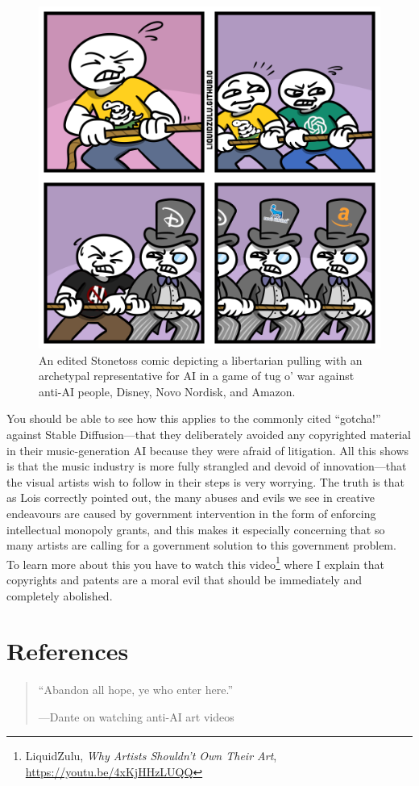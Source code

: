 \documentclass[11pt]{article}
\begin{document}
\begin{figure}[htbp]
\centering
\includegraphics[width=.9\linewidth]{./images/tug-of-war.png}
\caption{An edited Stonetoss comic depicting a libertarian pulling with an archetypal representative for AI in a game of tug o' war against anti-AI people, Disney, Novo Nordisk, and Amazon.}
\end{figure}

You should be able to see how this applies to the commonly cited ``gotcha!'' against Stable Diffusion---that they deliberately avoided any copyrighted material in their music-generation AI because they were afraid of litigation. All this shows is that the music industry is more fully strangled and devoid of innovation---that the visual artists wish to follow in their steps is very worrying. The truth is that as Lois correctly pointed out, the many abuses and evils we see in creative endeavours are caused by government intervention in the form of enforcing intellectual monopoly grants, and this makes it especially concerning that so many artists are calling for a government solution to this government problem. To learn more about this you have to watch this video\footnote{LiquidZulu, \emph{Why Artists Shouldn't Own Their Art}, \url{https://youtu.be/4xKjHHzLUQQ}} where I explain that copyrights and patents are a moral evil that should be immediately and completely abolished.

\section*{References}
\label{sec:orgea952b7}
\begin{quote}
``Abandon all hope, ye who enter here.''

---Dante on watching anti-AI art videos
\end{quote}
\end{document}
